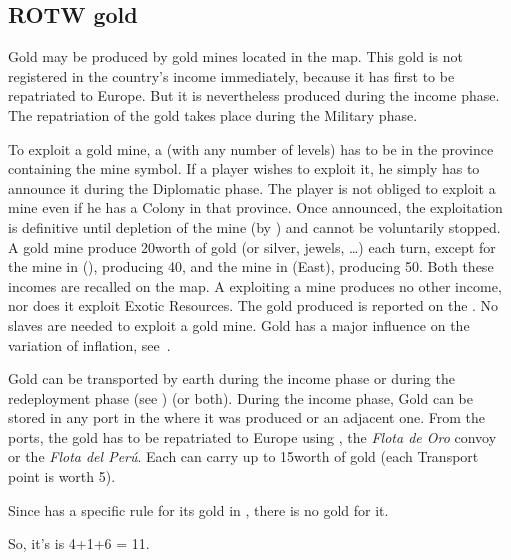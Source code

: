 \subsection{ROTW gold}
\begin{note} Gold may be produced by gold mines located in the \ROTW
  map. This gold is not registered in the country's income immediately,
  because it has first to be repatriated to Europe. But it is
  nevertheless produced during the income phase. The repatriation of the
  gold takes place during the Military phase.
\end{note}
\aparag To exploit a gold mine, a \COL (with any number of levels) has
to be in the province containing the mine symbol. If a player wishes to
exploit it, he simply has to announce it during the Diplomatic phase.
\bparag The player is not obliged to exploit a mine even if he has a
Colony in that province.
\bparag Once announced, the exploitation is definitive until depletion
of the mine (by ) and cannot be voluntarily
stopped.
\bparag A \ROTW gold mine produce 20\ducats worth of gold (or silver,
jewels, \ldots) each turn, except for the mine in \villeTenochtitlan
(\granderegionAzteca), producing 40\ducats, and the mine in
\bazarPotosi (\granderegionInca East), producing 50\ducats. Both
these incomes are recalled on the map.
\bparag\label{chIncomes:Gold Colonies} A \COL exploiting a mine produces no
other income, nor does it exploit Exotic Resources. The gold produced is
reported on the .
\bparag No slaves are needed to exploit a gold mine.
\bparag Gold has a major influence on the variation of inflation,
see~.

\aparag \label{chIncomes:Gold Production} Gold can be transported by
earth during the income phase or during the redeployment phase (see
) (or both).
\bparag During the income phase, Gold can be stored in any port \COL in
the \Area where it was produced or an adjacent one.
\bparag From the ports, the gold has to be repatriated to Europe using
\NTD, the \emph{Flota de Oro} convoy or the \emph{Flota del
  Per\'u}. Each \NTD can carry up to 15\ducats worth of gold (each
Transport point is worth 5\ducats).

\begin{exemple}
  Since \POR has a specific rule for its gold in \constructionElmina,
  there is no \ROTW gold for it.

  So, it's  is 4+1+6 = 11\ducats.
\end{exemple}

